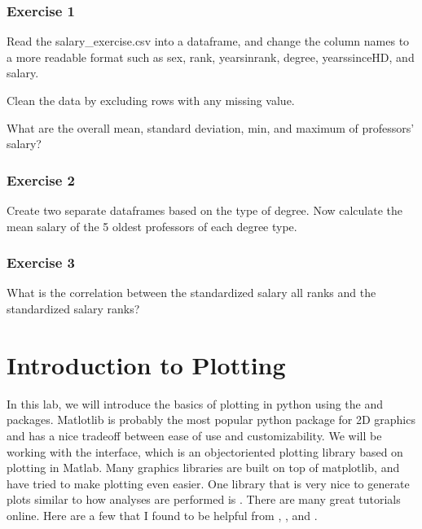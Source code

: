 \documentclass[letterpaper,10pt,english]{sphinxmanual}
\begin{document}
\subsubsection{Exercise 1}
\label{\detokenize{content/Introduction_to_Pandas:exercise-1}}
Read the salary\_exercise.csv into a dataframe, and change the column names to a more readable format such as sex, rank, yearsinrank, degree, yearssinceHD, and salary.

Clean the data by excluding rows with any missing value.

What are the overall mean, standard deviation, min, and maximum of professors’ salary?


\subsubsection{Exercise 2}
\label{\detokenize{content/Introduction_to_Pandas:exercise-2}}
Create two separate dataframes based on the type of degree. Now calculate the mean salary of the 5 oldest professors of each degree type.


\subsubsection{Exercise 3}
\label{\detokenize{content/Introduction_to_Pandas:exercise-3}}
What is the correlation between the standardized salary  all ranks and the standardized salary  ranks?


\section{Introduction to Plotting}
\label{\detokenize{content/Introduction_to_Plotting:introduction-to-plotting}}\label{\detokenize{content/Introduction_to_Plotting::doc}}

In this lab, we will introduce the basics of plotting in python using the  and  packages. Matlotlib is probably the most popular python package for 2D graphics and has a nice tradeoff between ease of use and customizability. We will be working with the  interface, which is an object\sphinxhyphen{}oriented plotting library based on plotting in Matlab. Many graphics libraries are built on top of matplotlib, and have tried to make plotting even easier. One library that is very nice to generate plots similar to how analyses are performed is . There are many great tutorials online. Here are a few that I found to be helpful from , , and .
\end{document}
